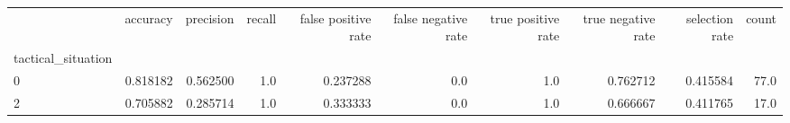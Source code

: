 \begin{tabular}{lrrrrrrrrr}
\toprule
{} &  accuracy &  precision &  recall &  false positive rate &  false negative rate &  true positive rate &  true negative rate &  selection rate &  count \\
tactical\_situation &           &            &         &                      &                      &                     &                     &                 &        \\
\midrule
0                  &  0.818182 &   0.562500 &     1.0 &             0.237288 &                  0.0 &                 1.0 &            0.762712 &        0.415584 &   77.0 \\
2                  &  0.705882 &   0.285714 &     1.0 &             0.333333 &                  0.0 &                 1.0 &            0.666667 &        0.411765 &   17.0 \\
\bottomrule
\end{tabular}

